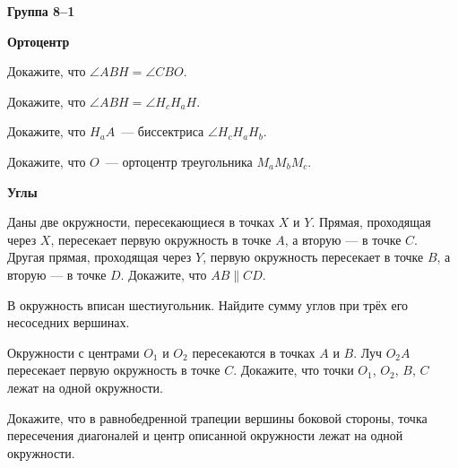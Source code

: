 \documentclass{article}
\begin{document}
    \large

    \begin{center}
        \textbf{Группа 8--1}
    \end{center}

    \begin{center}
        \textbf{Ортоцентр}
    \end{center}

    \begin{enumerate_boxed}

        \item Докажите, что $\angle ABH = \angle CBO$.

        \item Докажите, что $\angle ABH = \angle H_{c}H_{a}H$.

        \item Докажите, что $H_{a}A$~--- биссектриса $ \angle H_{c}H_{a}H_b$.

        \item Докажите, что $O$~--- ортоцентр треугольника $M_{a}M_{b}M_c$.

    \end{enumerate_boxed}


    \begin{center}
        \textbf{Углы}
    \end{center}

    \begin{enumerate_boxed}

        \item Даны две окружности, пересекающиеся в точках $X$ и $Y$.
        Прямая, проходящая через $X$, пересекает первую окружность в точке $A$, а вторую — в точке $C$.
        Другая прямая, проходящая через $Y$, первую окружность пересекает в точке $B$, а вторую — в точке $D$.
        Докажите, что $AB \parallel CD$.

        \item В окружность вписан шестиугольник.
        Найдите сумму углов при трёх его несоседних вершинах.

        \item Окружности с центрами $O_1$ и $O_2$ пересекаются в точках $A$ и $B$.
        Луч $O_{2}A$ пересекает первую окружность в точке $C$.
        Докажите, что точки $O_1$, $O_2$, $B$, $C$ лежат на одной окружности.

        \item Докажите, что в равнобедренной трапеции вершины боковой стороны, точка пересечения диагоналей и центр описанной окружности лежат на одной окружности.

    \end{enumerate_boxed}
\end{document}
